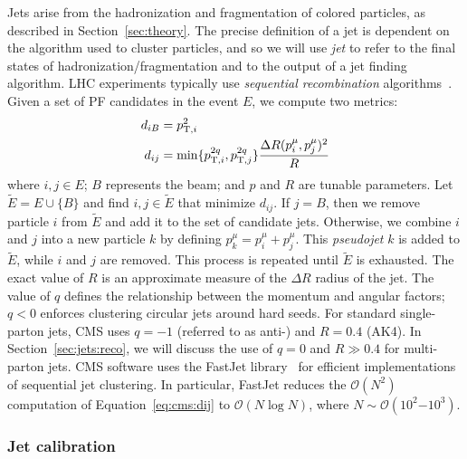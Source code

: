 Jets arise from the hadronization and fragmentation of colored particles, as described in Section~\ref{sec:theory}.
The precise definition of a jet is dependent on the algorithm used to cluster particles, and so we will use \emph{jet} to refer to the final states of hadronization/fragmentation and to the output of a jet finding algorithm.
LHC experiments typically use \emph{sequential recombination} algorithms~\cite{antikt,kt,ca}.
Given a set of PF candidates in the event $E$, we compute two metrics:
\begin{align}
    d_{iB} &= p_{\mathrm{T},i}^2 \nonumber \\ 
    d_{ij} &= \min\{p_{\mathrm{T},i}^{2q}, p_{\mathrm{T},j}^{2q}\} \frac{\Delta R(p_i^\mu, p_j^\mu)^2}{R}
    \label{eq:cms:dij}
\end{align}
where $i,j \in E$; $B$ represents the beam; and $p$ and $R$ are tunable parameters.
Let $\tilde E = E \cup \{B\}$ and find $i,j\in \tilde E$ that minimize $d_{ij}$.
If $j=B$, then we remove particle $i$ from $\tilde E$ and add it to the set of candidate jets.
Otherwise, we combine $i$ and $j$ into a new particle $k$ by defining $p_k^\mu = p_i^\mu + p_j^\mu$.
This \emph{pseudojet} $k$ is added to $\tilde E$, while $i$ and $j$ are removed.
This process is repeated until $\tilde E$ is exhausted.
The exact value of $R$ is an approximate measure of the $\Delta R$ radius of the jet. 
The value of $q$ defines the relationship between the momentum and angular factors; $q<0$  enforces clustering circular jets around hard seeds.
For standard single-parton jets, CMS uses $q=-1$ (referred to as anti-\kt) and $R=0.4$ (AK4).
In Section~\ref{sec:jets:reco}, we will discuss the use of $q=0$ and $R\gg 0.4$ for multi-parton jets. 
CMS software uses the FastJet library~\cite{fastjet} for efficient implementations of sequential jet clustering.
In particular, FastJet reduces the $\mathcal{O}(N^2)$ computation of Equation~\ref{eq:cms:dij} to $\mathcal{O}(N\log N)$, where $N\sim\mathcal{O}(10^{2}\mathrm{-}10^3)$. 

\subsubsection{Jet calibration}

